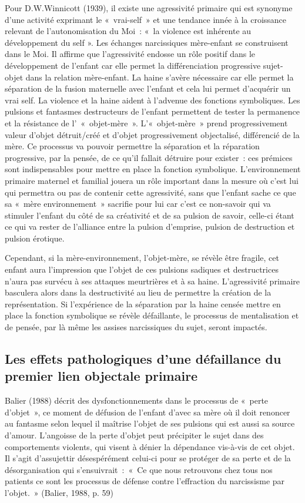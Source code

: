 \documentclass[12pt, a4paper]{book}
\begin{document}
\begin{spacing}{1.5}
Pour D.W.Winnicott (1939), il existe une agressivité primaire qui est synonyme d'une activité exprimant le « vrai-self » et une tendance innée à la croissance relevant de l'autonomisation du Moi : « la violence est inhérente au développement du self ».  Les échanges narcissiques mère-enfant se construisent dans le Moi. Il affirme que l'agressivité endosse un rôle positif dans le développement de l'enfant car elle permet la différenciation progressive sujet-objet dans la relation mère-enfant. La haine s'avère nécessaire car elle permet la séparation de la fusion maternelle avec l'enfant et cela lui permet d'acquérir un vrai self. La violence et la haine aident à l'advenue des fonctions symboliques. Les pulsions et fantasmes destructeurs de l'enfant permettent de tester la permanence et la résistance de l' « objet-mère ». L'« objet-mère » prend progressivement valeur d'objet détruit/créé et d'objet progressivement objectalisé, différencié de la mère. Ce processus va pouvoir permettre la séparation et la réparation progressive, par la pensée, de ce qu'il fallait détruire pour exister : ces prémices sont indispensables pour mettre en place la fonction symbolique. L'environnement primaire maternel et familial jouera un rôle important dans la mesure où c'est lui qui permettra ou pas de contenir cette agressivité, sans que l'enfant sache ce que sa « mère environnement » sacrifie pour lui car c'est ce non-savoir qui va stimuler l'enfant du côté de sa créativité et de sa pulsion de savoir, celle-ci étant ce qui va rester de l'alliance entre la pulsion d'emprise, pulsion de destruction et pulsion érotique.

Cependant, si la mère-environnement, l'objet-mère, se révèle être fragile, cet enfant aura l'impression que l'objet de ces pulsions sadiques et destructrices n'aura pas survécu à ses attaques meurtrières et à sa haine. L'agressivité primaire basculera alors dans la destructivité au lieu de permettre la création de la représentation. Si l'expérience de la séparation par la haine censée mettre en place la fonction symbolique se révèle défaillante, le processus de mentalisation et de pensée, par là même les assises narcissiques du sujet, seront impactés. 

\subsection{Les effets pathologiques d'une défaillance du premier lien objectale primaire}

Balier (1988) décrit des dysfonctionnements dans le processus de « perte d'objet », ce moment de défusion de l'enfant d'avec sa mère où il doit renoncer au fantasme selon lequel il maîtrise l'objet de ses pulsions qui est aussi sa source d'amour. L'angoisse de la perte d'objet peut précipiter le sujet dans des comportements violents, qui visent à dénier la dépendance vis-à-vis de cet objet. Il s'agit d'assujettir désespérément celui-ci pour se protéger de sa perte et de la désorganisation qui s'ensuivrait : « Ce que nous retrouvons chez tous nos patients ce sont les processus de défense contre l'effraction du narcissisme par l'objet. » (Balier, 1988, p. 59)


\end{spacing}
\end{document}
